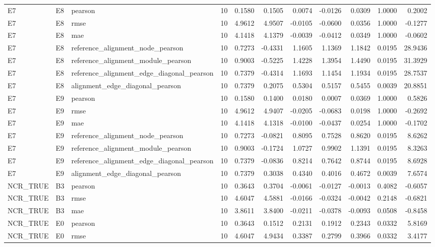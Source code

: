 \begin{tabular}{lllrrrrrrrr}
E7 & E8 & pearson & 10 & 0.1580 & 0.1505 & 0.0074 & -0.0126 & 0.0309 & 1.0000 & 0.2002 \\
E7 & E8 & rmse & 10 & 4.9612 & 4.9507 & -0.0105 & -0.0600 & 0.0356 & 1.0000 & -0.1277 \\
E7 & E8 & mae & 10 & 4.1418 & 4.1379 & -0.0039 & -0.0412 & 0.0349 & 1.0000 & -0.0602 \\
E7 & E8 & reference_alignment_node_pearson & 10 & 0.7273 & -0.4331 & 1.1605 & 1.1369 & 1.1842 & 0.0195 & 28.9436 \\
E7 & E8 & reference_alignment_module_pearson & 10 & 0.9003 & -0.5225 & 1.4228 & 1.3954 & 1.4490 & 0.0195 & 31.3929 \\
E7 & E8 & reference_alignment_edge_diagonal_pearson & 10 & 0.7379 & -0.4314 & 1.1693 & 1.1454 & 1.1934 & 0.0195 & 28.7537 \\
E7 & E8 & alignment_edge_diagonal_pearson & 10 & 0.7379 & 0.2075 & 0.5304 & 0.5157 & 0.5455 & 0.0039 & 20.8851 \\
E7 & E9 & pearson & 10 & 0.1580 & 0.1400 & 0.0180 & 0.0007 & 0.0369 & 1.0000 & 0.5826 \\
E7 & E9 & rmse & 10 & 4.9612 & 4.9407 & -0.0205 & -0.0683 & 0.0198 & 1.0000 & -0.2692 \\
E7 & E9 & mae & 10 & 4.1418 & 4.1318 & -0.0100 & -0.0437 & 0.0254 & 1.0000 & -0.1702 \\
E7 & E9 & reference_alignment_node_pearson & 10 & 0.7273 & -0.0821 & 0.8095 & 0.7528 & 0.8620 & 0.0195 & 8.6262 \\
E7 & E9 & reference_alignment_module_pearson & 10 & 0.9003 & -0.1724 & 1.0727 & 0.9902 & 1.1391 & 0.0195 & 8.3263 \\
E7 & E9 & reference_alignment_edge_diagonal_pearson & 10 & 0.7379 & -0.0836 & 0.8214 & 0.7642 & 0.8744 & 0.0195 & 8.6928 \\
E7 & E9 & alignment_edge_diagonal_pearson & 10 & 0.7379 & 0.3038 & 0.4340 & 0.4016 & 0.4672 & 0.0039 & 7.6574 \\
NCR_TRUE & B3 & pearson & 10 & 0.3643 & 0.3704 & -0.0061 & -0.0127 & -0.0013 & 0.4082 & -0.6057 \\
NCR_TRUE & B3 & rmse & 10 & 4.6047 & 4.5881 & -0.0166 & -0.0324 & -0.0042 & 0.2148 & -0.6821 \\
NCR_TRUE & B3 & mae & 10 & 3.8611 & 3.8400 & -0.0211 & -0.0378 & -0.0093 & 0.0508 & -0.8458 \\
NCR_TRUE & E0 & pearson & 10 & 0.3643 & 0.1512 & 0.2131 & 0.1912 & 0.2343 & 0.0332 & 5.8169 \\
NCR_TRUE & E0 & rmse & 10 & 4.6047 & 4.9434 & 0.3387 & 0.2799 & 0.3966 & 0.0332 & 3.4177 \\

\end{tabular}
